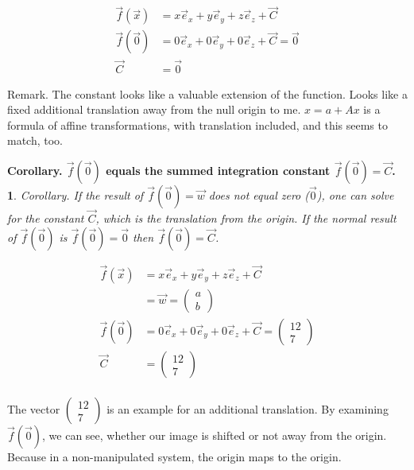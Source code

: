 \documentclass[a4paper]{article}
\begin{document}
\begin{displaymath}
\begin{align}
\vec{f}(\vec{x}) &= x\vec{e}_{x} + y\vec{e}_{y} + z\vec{e}_{z} + \vec{C}\\
\vec{f}(\vec{0}) &= 0\vec{e}_{x} + 0\vec{e}_{y} + 0\vec{e}_{z} + \vec{C} = \vec{0}\\
\vec{C} &= \vec{0}
\end{align}
\end{displaymath}

Remark. The constant looks like a valuable extension of the function. Looks like a fixed additional translation away from the null origin to me. $x=a+Ax$ is a formula of affine transformations, with translation included, and this seems to match, too.\\

\newtheorem{CorollaryConstant}{Corollary. $\vec{f}(\vec{0})$ equals the summed integration constant $\vec{f}(\vec{0})=\vec{C}$.}
\begin{CorollaryConstant}
Corollary. If the result of $\vec{f}({\vec{0}})=\vec{w}$ does not equal zero ($\vec{0}$), one can solve for the constant $\vec{C}$, which is the translation from the origin. If the normal result of $\vec{f}({\vec{0}})$ is $\vec{f}({\vec{0}})=\vec{0}$ then $\vec{f}({\vec{0}})=\vec{C}$.
\end{CorollaryConstant}

\begin{displaymath}
\begin{align}
\vec{f}(\vec{x}) &= x\vec{e}_{x} + y\vec{e}_{y} + z\vec{e}_{z} + \vec{C}\\ &= \vec{w} = \begin{pmatrix}a\\b\end{pmatrix}\\
\vec{f}(\vec{0}) &= 0\vec{e}_{x} + 0\vec{e}_{y} + 0\vec{e}_{z} + \vec{C} = \begin{pmatrix}12\\7\end{pmatrix}\\
\vec{C} &= \begin{pmatrix}12\\7\end{pmatrix}\\
\end{align}
\end{displaymath}

The vector $\begin{pmatrix}12\\7\end{pmatrix}$ is an example for an additional translation. By examining $\vec{f}(\vec{0})$, we can see, whether our image is shifted or not away from the origin. Because in a non-manipulated system, the origin maps to the origin. \\
\end{document}
